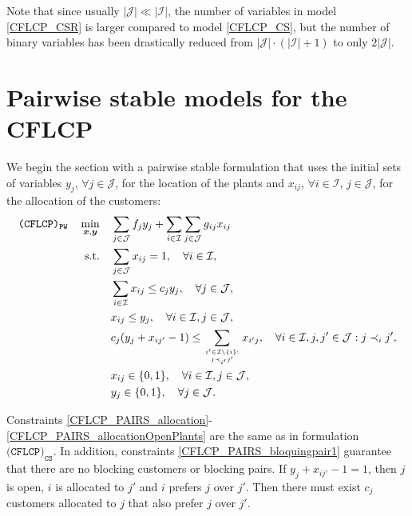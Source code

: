 \documentclass[preprint,11pt,authoryear]{elsarticle}
\def\J{\mathcal{J}}
\def\I{\mathcal{I}}
\begin{document}
Note that since usually $|\J| \ll |\I|$, the number of variables in model \eqref{CFLCP_CSR} is larger compared to model  \eqref{CFLCP_CS}, but the number of binary variables has been drastically reduced from $|\J| \cdot (|\I|+1)$ to only $2|\J|$.





\section{Pairwise stable models for the CFLCP} \label{sec:pairwisestablemodels}

We begin the section with a pairwise stable formulation that uses the initial sets of variables $y_j$, $\forall j\in \J$, for the location of the plants and $x_{ij}$, $\forall i\in \I$, $j\in\J$, for the allocation of the customers:
\begin{subequations} \label{CFLCP_PAIRS}
\begin{align}
\texttt{(CFLCP)}_{\texttt{PW}} \quad \min_{\boldsymbol{x},\boldsymbol{y}} \quad & \sum_{j\in \J} f_jy_j + \sum_{i\in \I} \sum_{j\in \J} g_{ij}x_{ij}  \label{CFLCP_PAIRS_FO} \\
\text{s.t.} \quad &\sum_{j\in \J} x_{ij} = 1, \quad \forall i\in \I, \label{CFLCP_PAIRS_allocation}\\
& \sum_{i\in \I} x_{ij}  \le c_jy_j, \quad \forall j\in\J, \label{CFLCP_PAIRS_capacity}\\
&x_{ij} \le y_j, \quad \forall i \in \I, j \in \J, \label{CFLCP_PAIRS_allocationOpenPlants} \\
&  c_j(y_j + x_{ij'} -1 ) \le \sum_{i'\in \I\setminus \{i\}: \atop j \prec_{i'} j'} x_{i'j}, \quad \forall i\in \I, j,j'\in \J: j \prec_i j', \label{CFLCP_PAIRS_bloquingpair1} \\
& x_{ij} \in \{0,1\}, \quad \forall i \in \I, j \in \J,  \label{CFLCP_PAIRS_xbinarias} \\
& y_j \in \{0,1\}, \quad \forall j \in \J.  \label{CFLCP_PAIRS_ybinarias}
\end{align}
\end{subequations}

Constraints \eqref{CFLCP_PAIRS_allocation}-\eqref{CFLCP_PAIRS_allocationOpenPlants} are the same as in formulation $\texttt{(CFLCP)}_{\texttt{CS}}$. In addition, constraints \eqref{CFLCP_PAIRS_bloquingpair1} guarantee that there are no blocking customers or blocking pairs. If $y_j + x_{ij'} -1=1$, then $j$ is open, $i$ is allocated to $j'$ and $i$ prefers $j$ over $j'$. Then there must exist $c_j$ customers allocated to $j$ that also prefer $j$ over $j'$.
\end{document}
